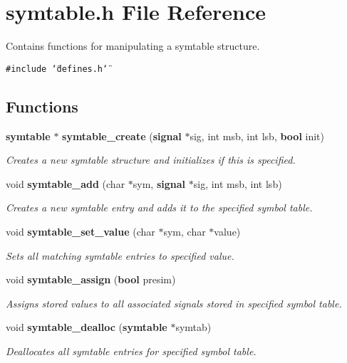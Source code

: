 \section{symtable.h File Reference}
\label{symtable_8h}
Contains functions for manipulating a symtable structure.  


{\tt \#include \char`\"{}defines.h\char`\"{}}\par
\subsection*{Functions}
\begin{CompactItemize}
\item 
{\bf symtable} $\ast$ {\bf symtable\_\-create} ({\bf signal} $\ast$sig, int msb, int lsb, {\bf bool} init)
\begin{CompactList}\small\item\em Creates a new symtable structure and initializes if this is specified. \item\end{CompactList}\item 
void {\bf symtable\_\-add} (char $\ast$sym, {\bf signal} $\ast$sig, int msb, int lsb)
\begin{CompactList}\small\item\em Creates a new symtable entry and adds it to the specified symbol table. \item\end{CompactList}\item 
void {\bf symtable\_\-set\_\-value} (char $\ast$sym, char $\ast$value)
\begin{CompactList}\small\item\em Sets all matching symtable entries to specified value. \item\end{CompactList}\item 
void {\bf symtable\_\-assign} ({\bf bool} presim)
\begin{CompactList}\small\item\em Assigns stored values to all associated signals stored in specified symbol table. \item\end{CompactList}\item 
void {\bf symtable\_\-dealloc} ({\bf symtable} $\ast$symtab)
\begin{CompactList}\small\item\em Deallocates all symtable entries for specified symbol table. \item\end{CompactList}\end{CompactItemize}


